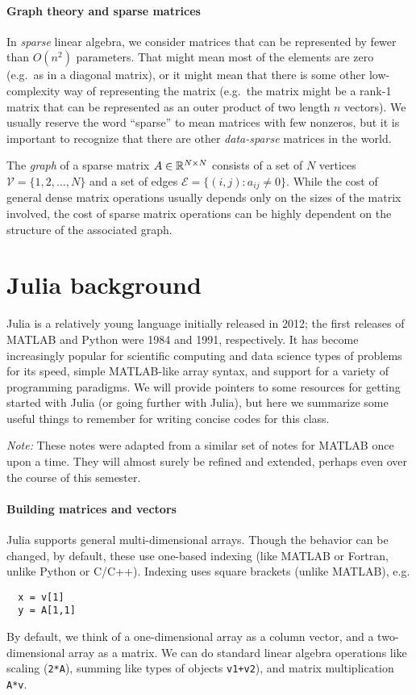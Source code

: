 \documentclass[12pt, leqno]{article}
\begin{document}
\paragraph{Graph theory and sparse matrices}
In {\em sparse} linear algebra, we consider matrices that can be
represented by fewer than $O(n^2)$ parameters.  That might mean most
of the elements are zero (e.g.~as in a diagonal matrix), or it might
mean that there is some other low-complexity way of representing the
matrix (e.g.~the matrix might be a rank-1 matrix that can be
represented as an outer product of two length $n$ vectors).  We
usually reserve the word ``sparse'' to mean matrices with few
nonzeros, but it is important to recognize that there are other
{\em data-sparse} matrices in the world.

The {\em graph} of a sparse matrix $A \in \mathbb{R}^{N \times N}$ consists
of a set of $N$ vertices $\mathcal{V} = \{1, 2, \ldots, N\}$ and a set
of edges $\mathcal{E} = \{(i,j) : a_{ij} \neq 0\}$.  While the cost of
general dense matrix operations usually depends only on the sizes of
the matrix involved, the cost of sparse matrix operations can be
highly dependent on the structure of the associated graph.

\section{Julia background}

Julia is a relatively young language initially released in 2012; the
first releases of MATLAB and Python were 1984 and 1991, respectively.
It has become increasingly popular for scientific computing and data
science types of problems for its speed, simple MATLAB-like array
syntax, and support for a variety of programming paradigms.  We will
provide pointers to some resources for getting started with Julia (or
going further with Julia), but here we summarize some useful things to
remember for writing concise codes for this class.

{\em Note:} These notes were adapted from a similar set of notes for
MATLAB once upon a time.  They will almost surely be refined and
extended, perhaps even over the course of this semester.

\paragraph{Building matrices and vectors}

Julia supports general multi-dimensional arrays.  Though the behavior
can be changed, by default, these use one-based indexing (like MATLAB
or Fortran, unlike Python or C/C++).  Indexing uses square brackets
(unlike MATLAB), e.g.
\begin{lstlisting}
  x = v[1]
  y = A[1,1]
\end{lstlisting}
By default, we think of a one-dimensional array as a column vector,
and a two-dimensional array as a matrix.  We can do standard linear
algebra operations like scaling ({\tt 2*A}), summing like types of objects
{\tt v1+v2}), and matrix multiplication {\tt A*v}.
\end{document}
